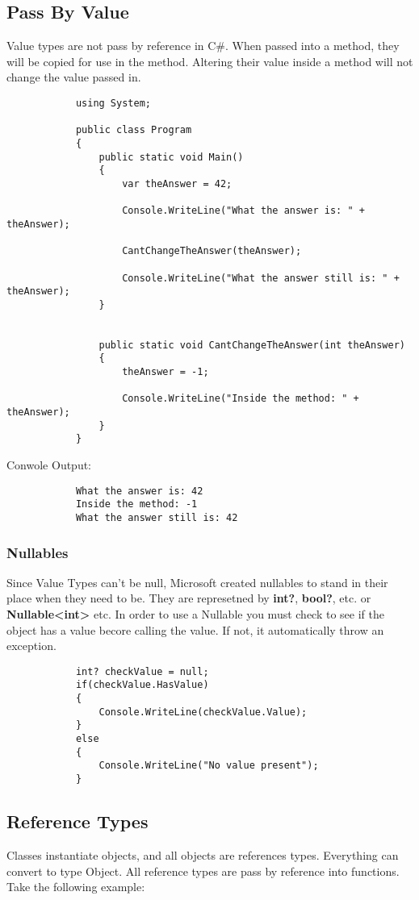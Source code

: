 \documentclass {amsart}
\begin{document}
		\subsection{Pass By Value}  Value types are not pass by reference in C\#. When passed into a method, they will be copied for use in the method.  Altering their value inside a method will not change the value passed in.

		\begin{lstlisting}
			using System;
								
			public class Program
			{
				public static void Main()
				{
					var theAnswer = 42;

					Console.WriteLine("What the answer is: " + theAnswer);
					
					CantChangeTheAnswer(theAnswer);
					
					Console.WriteLine("What the answer still is: " + theAnswer);
				}
				
				
				public static void CantChangeTheAnswer(int theAnswer)
				{
					theAnswer = -1;
					
					Console.WriteLine("Inside the method: " + theAnswer);
				}
			}
		\end{lstlisting}  
		Conwole Output:
		\begin{verbatim}
			What the answer is: 42
			Inside the method: -1
			What the answer still is: 42
		\end{verbatim}


		\subsubsection{Nullables} Since Value Types can't be null, Microsoft created nullables to stand in their place when they need to be.  They are represetned by {\bf int?}, {\bf bool?}, etc. or {\bf Nullable\textless int\textgreater} \space etc.  In order to use a Nullable you must check to see if the object has a value becore calling the value.  If not, it automatically throw an exception.

		\begin{lstlisting}
			int? checkValue = null;
			if(checkValue.HasValue)
			{
				Console.WriteLine(checkValue.Value);
			}
			else
			{
				Console.WriteLine("No value present");
			}
		\end{lstlisting}

	\subsection{Reference Types}  Classes instantiate objects, and all objects are references types.  Everything can convert to type Object.  All reference types are pass by reference into functions.  Take the following example: 
\end{document}
